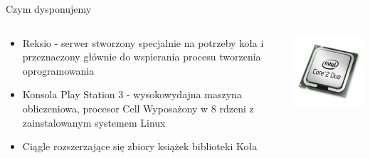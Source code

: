 \documentclass{beamer}
\begin{document}
\begin{frame}{Czym dysponujemy}
	\begin{minipage}[0.2\textheight]{\textwidth}
	\begin{columns}[T]
	\begin{column}{0.5\textwidth}
	\begin{itemize}
	\item Reksio - serwer stworzony specjalnie na potrzeby koła i przeznaczony głównie do wspierania procesu tworzenia oprogramowania
	\item Konsola Play Station 3 - wysokowydajna maszyna obliczeniowa, procesor Cell Wyposażony w 8 rdzeni z zainstalowanym systemem Linux
	\item Ciągle rozszerzające się zbiory książek biblioteki Koła
	\end{itemize}
	\end{column}
	\begin{column}{0.5\textwidth}
	\vspace{0.5cm}
	\includegraphics[width=6cm]{procesor.jpg}\\
	\end{column}
	\end{columns}

	\end{minipage}
\end{frame}
\end{document}
